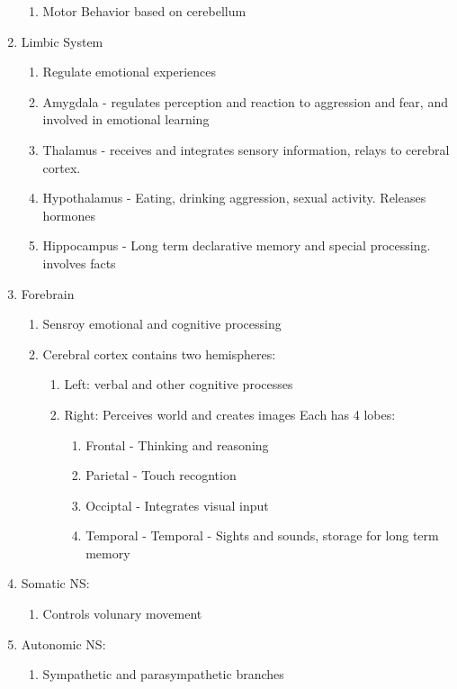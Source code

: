 \documentclass[12pt]{article}
\begin{document}
\begin{enumerate}
  \begin{enumerate}
  \item Motor Behavior based on cerebellum
  \end{enumerate}
\item Limbic System
  \begin{enumerate}
  \item Regulate emotional experiences
  \item Amygdala - regulates perception and reaction to aggression and
    fear, and involved in emotional learning
  \item Thalamus - receives and integrates sensory information, relays
    to cerebral cortex.
  \item Hypothalamus - Eating, drinking aggression, sexual
    activity. Releases hormones
  \item Hippocampus - Long term declarative memory and special
    processing. involves facts
  \end{enumerate}
\item Forebrain
  \begin{enumerate}
  \item Sensroy emotional and cognitive processing
  \item Cerebral cortex contains two hemispheres:
    \begin{enumerate}
    \item Left: verbal and other cognitive processes
    \item Right: Perceives world and creates images
      Each has 4 lobes:
      \begin{enumerate}
      \item Frontal - Thinking and reasoning
      \item Parietal - Touch recogntion
      \item Occiptal - Integrates visual input
      \item Temporal - Temporal - Sights and sounds, storage for long
        term memory
      \end{enumerate}
    \end{enumerate}
  \end{enumerate}
\item Somatic NS:
  \begin{enumerate}
  \item Controls volunary movement
  \end{enumerate}
\item Autonomic NS:
  \begin{enumerate}
  \item Sympathetic and parasympathetic branches

\end{enumerate}
\end{enumerate}
\end{document}
